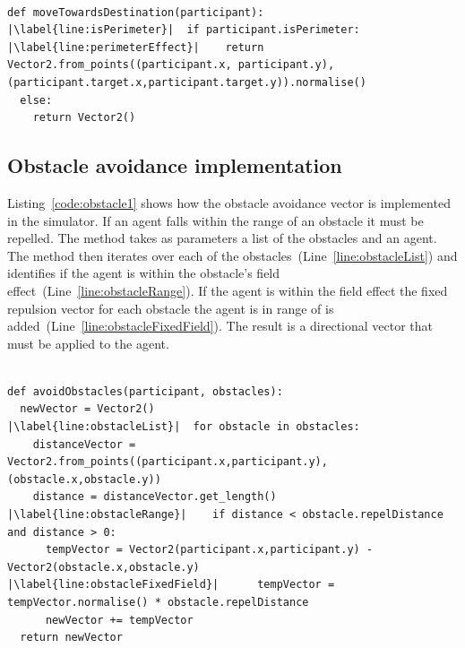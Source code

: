 \lstset{language=Python,
basicstyle=\tiny,
numbers=left, 
numberstyle=\tiny,
captionpos=b,
frame=single,
breaklines=true,
caption=Repulsion code,
escapechar=|
} %
\begin{lstlisting}[label={code:destination1}]  % Start your code-block

def moveTowardsDestination(participant):
|\label{line:isPerimeter}|  if participant.isPerimeter:
|\label{line:perimeterEffect}|    return Vector2.from_points((participant.x, participant.y),(participant.target.x,participant.target.y)).normalise()
  else:
    return Vector2()
\end{lstlisting}

\subsection{Obstacle avoidance implementation}
Listing~\ref{code:obstacle1} shows how the obstacle avoidance vector is implemented in the simulator. If an agent falls within the range of an obstacle it must be repelled. The method takes as parameters a list of the obstacles and an agent. The method then iterates over each of the obstacles~(Line~\ref{line:obstacleList}) and identifies if the agent is within the obstacle's field effect~(Line~\ref{line:obstacleRange}). If the agent is within the field effect the fixed repulsion vector for each obstacle the agent is in range of is added~(Line~\ref{line:obstacleFixedField}). The result is a directional vector that must be applied to the agent.
 
\lstset{language=Python,
basicstyle=\tiny,
numbers=left, 
numberstyle=\tiny,
captionpos=b,
frame=single,
breaklines=true,
caption=Obstacle avoidance code,
escapechar=|
} %
\begin{lstlisting}[label={code:obstacle1}]  % Start your code-block

def avoidObstacles(participant, obstacles):
  newVector = Vector2()
|\label{line:obstacleList}|  for obstacle in obstacles:
    distanceVector = Vector2.from_points((participant.x,participant.y),(obstacle.x,obstacle.y))
    distance = distanceVector.get_length()
|\label{line:obstacleRange}|    if distance < obstacle.repelDistance and distance > 0:
      tempVector = Vector2(participant.x,participant.y) - Vector2(obstacle.x,obstacle.y)
|\label{line:obstacleFixedField}|      tempVector = tempVector.normalise() * obstacle.repelDistance
      newVector += tempVector
  return newVector
\end{lstlisting}

